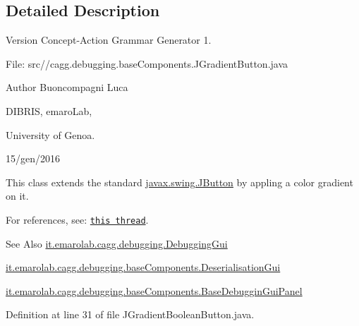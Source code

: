 \subsection{Detailed Description}
\begin{DoxyVersion}{Version}
Concept-\/\-Action Grammar Generator 1. \par
 File\-: src//cagg.debugging.\-base\-Components.\-J\-Gradient\-Button.\-java \par

\end{DoxyVersion}
\begin{DoxyAuthor}{Author}
Buoncompagni Luca \par
 D\-I\-B\-R\-I\-S, emaro\-Lab,\par
 University of Genoa. \par
 15/gen/2016 \par

\end{DoxyAuthor}


This class extends the standard \hyperlink{}{javax.\-swing.\-J\-Button} by appling a color gradient on it.\par
 For references, see\-: \href{http://stackoverflow.com/questions/7115672/change-jbutton-gradient-color-but-only-for-one-button-not-all}{\tt this thread}. 

\begin{DoxySeeAlso}{See Also}
\hyperlink{classit_1_1emarolab_1_1cagg_1_1debugging_1_1DebuggingGui}{it.\-emarolab.\-cagg.\-debugging.\-Debugging\-Gui} 

\hyperlink{classit_1_1emarolab_1_1cagg_1_1debugging_1_1baseComponents_1_1DeserialisationGui}{it.\-emarolab.\-cagg.\-debugging.\-base\-Components.\-Deserialisation\-Gui} 

\hyperlink{classit_1_1emarolab_1_1cagg_1_1debugging_1_1baseComponents_1_1BaseDebugginGuiPanel}{it.\-emarolab.\-cagg.\-debugging.\-base\-Components.\-Base\-Debuggin\-Gui\-Panel} 
\end{DoxySeeAlso}


Definition at line 31 of file J\-Gradient\-Boolean\-Button.\-java.




